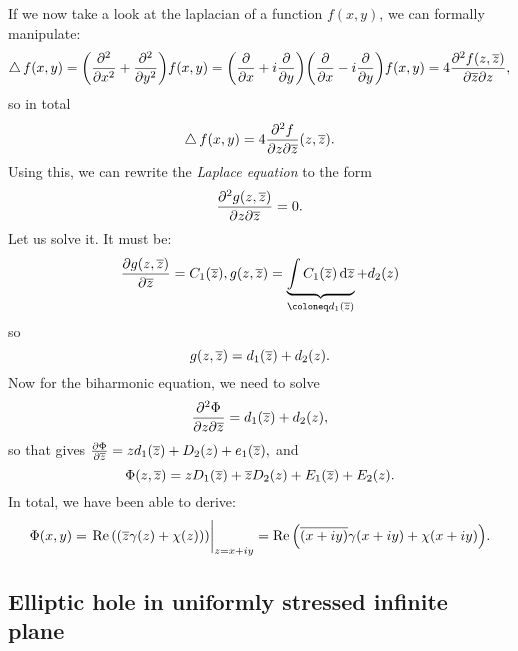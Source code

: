 \documentclass[reqno, a4paper]{article}
\begin{document}
If we now take a look at the laplacian of a function $f(x,y)$, we can formally manipulate:
\[
	\operatorname{\bigtriangleup} f\qty(x,y) = \qty(\pdv[2]{x}+\pdv[2]{y})f\qty(x,y) = \qty(\pdv{x}+i\pdv{y})\qty(\pdv{x}-i\pdv{y})f\qty(x,y) = 4 \pdv[2]{f\qty(z,\overline{z})}{\overline{z}}{z},
\]
so in total
\[
	\operatorname{\bigtriangleup} f\qty(x,y) = 4 \pdv[2]{f}{z}{\overline{z}}\qty(z,\overline{z}).
\]
Using this, we can rewrite the \textit{Laplace equation} to the form
\[
	\pdv[2]{g\qty(z,\overline{z})}{z}{\overline{z}} = 0.
\]
Let us solve it. It must be:
\[
	\pdv{g\qty(z,\overline{z})}{\overline{z}} = C_1\qty(\overline{z}), g\qty(z,\overline{z}) = \underbrace{\int C_1\qty(\overline{z})\dd{\overline{z}}}_{\coloneq d_1\qty(\overline{z})} + d_2\qty(z)
\]
so
\[
	g\qty(z,\overline{z}) = d_1(\overline{z}) + d_2\qty(z).
\]
Now for the biharmonic equation, we need to solve
\[
	\pdv[2]{\Phi}{z}{\overline{z}} = d_1\qty(\overline{z})+d_2\qty(z),
\]
so that gives $\pdv{\Phi}{\overline{z}} = z d_1\qty(\overline{z})+D_2(z) + e_1(\overline{z}),$ and
\[
	\Phi\qty(z,\overline{z}) = z D_1\qty(\overline{z})+\overline{z}D_2(z) + E_1(\overline{z}) + E_2\qty(z).
\]
In total, we have been able to derive:
\[
	\Phi\qty(x,y) = \eval{\Re\qty(\qty(\overline{z}\gamma(z)+\chi(z)))}_{z=x+iy} = \Re\qty(\overline{\qty(x+iy)}\gamma\qty(x+iy)+\chi\qty(x+iy)).
\]

\subsection{Elliptic hole in uniformly stressed infinite plane}
\label{sec:elliptic_hole}
\end{document}

